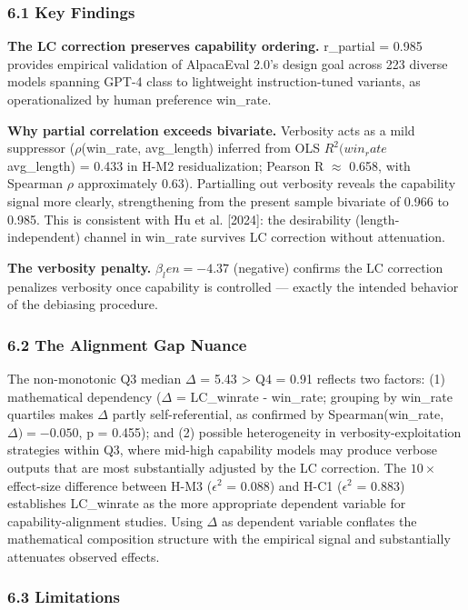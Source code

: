
\subsubsection{6.1 Key Findings}

\textbf{The LC correction preserves capability ordering.} r\_partial = 0.985 provides empirical validation of AlpacaEval 2.0's design goal across 223 diverse models spanning GPT-4 class to lightweight instruction-tuned variants, as operationalized by human preference win\_rate.

\textbf{Why partial correlation exceeds bivariate.} Verbosity acts as a mild suppressor ($\rho$(win\_rate, avg\_length) inferred from OLS $R^{2}(win_rate$ ~ avg\_length) = 0.433 in H-M2 residualization; Pearson R $\approx$ 0.658, with Spearman $\rho$ approximately 0.63). Partialling out verbosity reveals the capability signal more clearly, strengthening from the present sample bivariate of 0.966 to 0.985. This is consistent with Hu et al. [2024]: the desirability (length-independent) channel in win\_rate survives LC correction without attenuation.

\textbf{The verbosity penalty.} $\beta _len = -4.37$ (negative) confirms the LC correction penalizes verbosity once capability is controlled --- exactly the intended behavior of the debiasing procedure.

\subsubsection{6.2 The Alignment Gap Nuance}

The non-monotonic Q3 median $\Delta$ = 5.43 > Q4 = 0.91 reflects two factors: (1) mathematical dependency ($\Delta$ = LC\_winrate - win\_rate; grouping by win\_rate quartiles makes $\Delta$ partly self-referential, as confirmed by Spearman(win\_rate, $\Delta ) = -0.050$, p = 0.455); and (2) possible heterogeneity in verbosity-exploitation strategies within Q3, where mid-high capability models may produce verbose outputs that are most substantially adjusted by the LC correction. The $10\times$ effect-size difference between H-M3 ($\epsilon ^2$ = 0.088) and H-C1 ($\epsilon ^2$ = 0.883) establishes LC\_winrate as the more appropriate dependent variable for capability-alignment studies. Using $\Delta$ as dependent variable conflates the mathematical composition structure with the empirical signal and substantially attenuates observed effects.

\subsubsection{6.3 Limitations}

